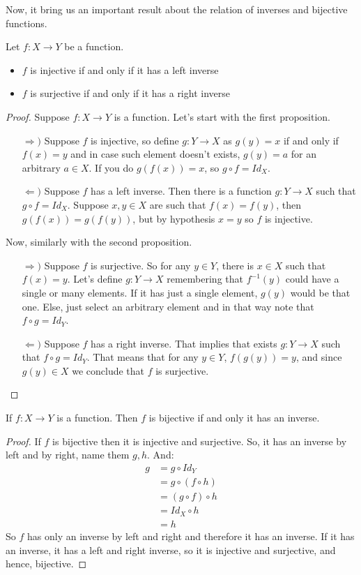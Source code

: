 \documentclass{tufte-handout}
\begin{document}
Now, it bring us an important result about the relation of inverses and bijective functions.
\begin{theorem}
	Let $f: X \to Y$ be a function.
	\begin{itemize}
		\item $f$ is injective if and only if it has a left inverse
		\item $f$ is surjective if and only if it has a right inverse
	\end{itemize}
\end{theorem}
\begin{proof}
	Suppose $f: X \to Y$ is a function. Let's start with the first proposition. 
	\begin{itemize}
		\item[$\Rightarrow)$] Suppose $f$ is injective, so define $g: Y \to X$ as $g(y) = x$ if and only if $f(x) = y$ and in case such element doesn't exists, $g(y) = a$ for an arbitrary $a \in X$. If you do $g(f(x)) = x$, so $g \circ f = Id_X$. 
		\item[$\Leftarrow)$] Suppose $f$ has a left inverse. Then there is a function $g: Y \to X$ such that $g \circ f = Id_X$. Suppose $x, y \in X$ are such that $f(x) = f(y)$, then $g(f(x)) = g(f(y))$, but by hypothesis $x = y$ so $f$ is injective. 
	\end{itemize}
	Now, similarly with the second proposition.
	\begin{itemize}
		\item[$\Rightarrow)$] Suppose $f$ is surjective. So for any $y \in Y$, there is $x \in X$ such that $f(x) = y$. Let's define $g: Y \to X$ remembering that $f^{-1}(y)$ could have a single or many elements. If it has just a single element, $g(y)$ would be that one. Else, just select an arbitrary element and in that way note that $f \circ g = Id_Y$.
		\item[$\Leftarrow)$] Suppose $f$ has a right inverse. That implies that exists $g: Y \to X$ such that $f \circ g = Id_Y$. That means that for any $y \in Y$, $f(g(y)) = y$, and since $g(y) \in X$ we conclude that $f$ is surjective.
	\end{itemize}
\end{proof}
\begin{corollary}
	If $f: X \to Y$ is a function. Then $f$ is bijective if and only it has an inverse. 
\end{corollary}
\begin{proof}
	If $f$ is bijective then it is injective and surjective. So, it has an inverse by left and by right, name them $g, h$. And:
	\begin{align*}
		g &= g \circ Id_Y\\ 
		&= g \circ (f \circ h)\\
		&= (g \circ f) \circ h\\
		&= Id_X \circ h\\
		&= h
	\end{align*}
	So $f$ has only an inverse by left and right and therefore it has an inverse. If it has an inverse, it has a left and right inverse, so it is injective and surjective, and hence, bijective.
\end{proof}
\end{document}
